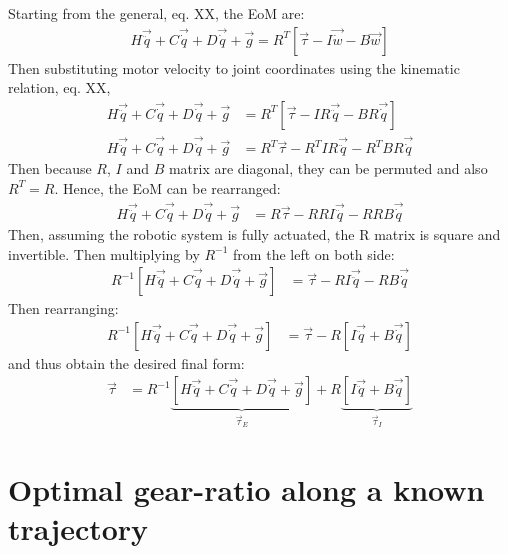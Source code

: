 Starting from the general, eq. XX, the EoM are:
%
\begin{align}
H \vec{ \ddot{q} } + C\vec{ \dot{q} } + D \vec{ \dot{q} } + \vec{ g }
		= R^T  \left[ 
		\vec{ \tau } - I \vec{ \dot{w} } - B \vec{ w }       
		\right]
\end{align}
%
Then substituting motor velocity to joint coordinates using the kinematic relation, eq. XX,
%
\begin{align}
H \vec{ \ddot{q} } + C\vec{ \dot{q} } + D \vec{ \dot{q} } + \vec{ g }
		&= R^T  \left[ 
		\vec{ \tau } - I R \vec{ \ddot{q} } - B R\vec{ \dot{q} }       
		\right] \\
H \vec{ \ddot{q} } + C\vec{ \dot{q} } + D \vec{ \dot{q} } + \vec{ g }
		&= R^T \vec{ \tau } - R^T I R \vec{ \ddot{q} } - R^T B R \vec{ \dot{q} }  
\end{align}
%
Then because $R$, $I$ and $B$ matrix are diagonal, they can be permuted and also $R^T=R$. Hence, the EoM can be rearranged:
%
\begin{align}
H \vec{ \ddot{q} } + C\vec{ \dot{q} } + D \vec{ \dot{q} } + \vec{ g }
		&= R \vec{ \tau } - R R I \vec{ \ddot{q} } - R R B \vec{ \dot{q} }  
\end{align}
%
Then, assuming the robotic system is fully actuated, the R matrix is square and invertible. Then multiplying by $R^{-1}$ from the left on both side:
%
\begin{align}
R^{-1} \left[ H \vec{ \ddot{q} } + C\vec{ \dot{q} } + D \vec{ \dot{q} } + \vec{ g } \right]
		&= \vec{ \tau } - R I \vec{ \ddot{q} } - R B \vec{ \dot{q} }  
\end{align}
%
Then rearranging:
%
\begin{align}
R^{-1} \left[ H \vec{ \ddot{q} } + C\vec{ \dot{q} } + D \vec{ \dot{q} } + \vec{ g } \right]
		&= \vec{ \tau } - R  \left[ I \vec{ \ddot{q} } + B \vec{ \dot{q} }  \right]
\end{align}
%
and thus obtain the desired final form:
%
\begin{align}
\vec{ \tau } &=  R^{-1} \underbrace{ \left[ H \vec{ \ddot{q} } + C\vec{ \dot{q} } + D \vec{ \dot{q} } + \vec{ g } \right] }_{\vec{\tau}_E}
 + R \underbrace{ \left[ I \vec{ \ddot{q} } + B \vec{ \dot{q} }  \right]}_{\vec{\tau}_I}
\end{align}
%




\section{Optimal gear-ratio along a known trajectory}
\label{sec:optgearproof}


